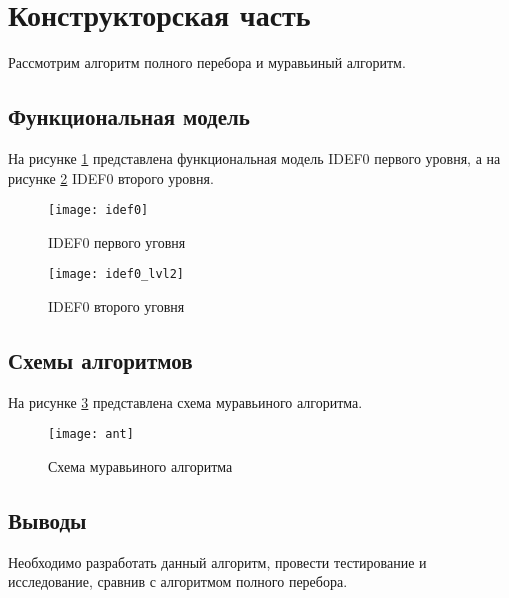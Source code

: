 \newpage
\section{Конструкторская часть}

Рассмотрим алгоритм полного перебора и муравьиный алгоритм.

\subsection{Функциональная модель}

На рисунке \ref{img:idef0} представлена функциональная модель IDEF0
первого уровня, а на рисунке \ref{img:idef0_2} IDEF0 второго уровня.

\begin{figure}[H]
    \centering
    \texttt{[image: idef0]}
    \caption{IDEF0 первого уговня}
    \label{img:idef0}
\end{figure}

\begin{figure}[H]
    \centering
    \texttt{[image: idef0\_lvl2]}
    \caption{IDEF0 второго уговня}
    \label{img:idef0_2}
\end{figure}

\subsection{Схемы алгоритмов}

На рисунке \ref{img:ant} представлена схема муравьиного алгоритма.

\begin{figure}[H]
    \centering
    \texttt{[image: ant]}
    \caption{Схема муравьиного алгоритма}
    \label{img:ant}
\end{figure}

\subsection{Выводы}

Необходимо разработать данный алгоритм, провести тестирование и исследование, сравнив с
алгоритмом полного перебора.
